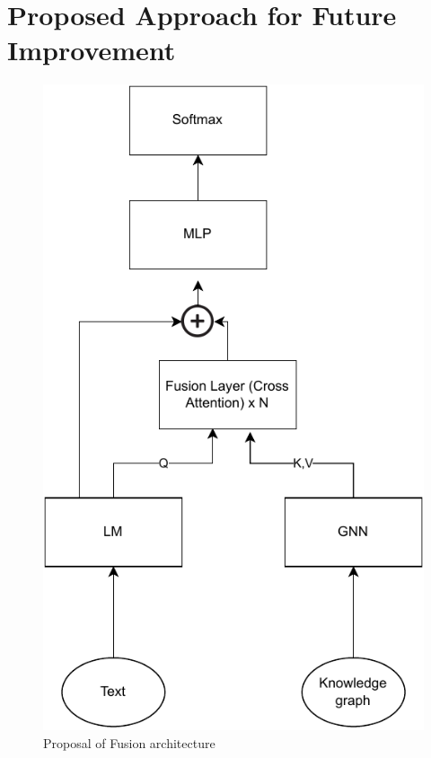 \section{Proposed Approach for Future Improvement}
\begin{figure}[hbt]
    \centering
    \includegraphics[width=0.6\linewidth]{experiements/image/proposal.pdf}
    \caption{Proposal of Fusion architecture}
    \label{fig:p_proposal}
\end{figure}


